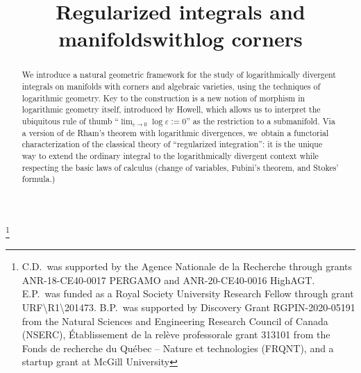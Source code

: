 \documentclass[JEP,XML,SOM,Unicode,NoFloatCountersInSection,published]{cedram}
\theoremstyle{definition}
\theoremstyle{remark}
\begin{document}
\frontmatter
\title{Regularized integrals and manifolds\nobreakspace with\nobreakspace log corners}

\author[\initial{C.} \lastname{Dupont}]{ }
\address{Institut Montpelliérain Alexander Grothendieck, Université de Montpellier, CNRS,\\
Place Eugène Bataillon, 34090 Montpellier, France}

\author[\initial{E.} \lastname{Panzer}]{ }
\address{Mathematical Institute, University of Oxford,\\
Woodstock Road, OX2 6GG Oxford, UK}

\author[\initial{B.} \lastname{Pym}]{ }
\address{Department of Mathematics and Statistics, McGill University,\\ Burnside Hall, 805 Sherbrooke Street West, Montreal, Quebec H3A 0B9, Canada}

\thanks{C.D.\ was supported by the Agence Nationale de la Recherche through grants ANR-18-CE40-0017 PERGAMO and ANR-20-CE40-0016 HighAGT.
E.P.\ was funded as a Royal Society University Research Fellow through grant {URF{\textbackslash}R1{\textbackslash}201473}.
B.P.\ was supported by Discovery Grant RGPIN-2020-05191 from the Natural Sciences and Engineering Research Council of Canada (NSERC), Établissement de la relève professorale grant 313101 from the Fonds de recherche du Québec -- Nature et technologies (FRQNT), and a startup grant at McGill University}


\begin{abstract}
We introduce a natural geometric framework for the study of logarithmically divergent integrals on manifolds with corners and algebraic varieties, using the techniques of logarithmic geometry. Key to the construction is a new notion of morphism in logarithmic geometry itself, introduced by Howell, which allows us to interpret the ubiquitous rule of thumb ``$\lim_{\varepsilon\to 0} \log \varepsilon := 0$'' as the restriction to a submanifold. Via a version of de Rham's theorem with logarithmic divergences, we~obtain a functorial characterization of the classical theory of ``regularized integration'': it is the unique way to extend the ordinary integral to the logarithmically divergent context while respecting the basic laws of calculus (change of variables, Fubini's theorem, and Stokes' formula.)
\end{abstract}
\end{document}
